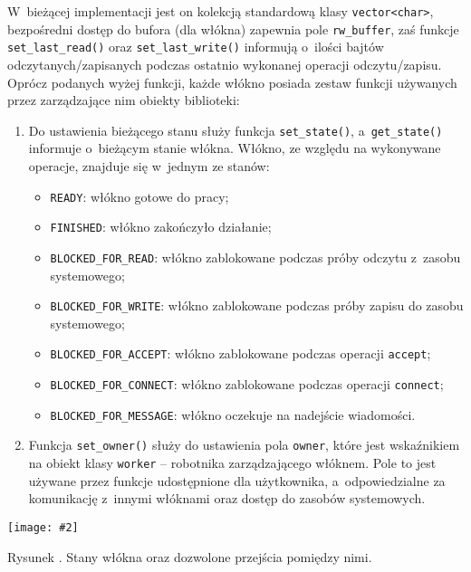 \documentclass[12pt]{mwart}
\newcommand{\code}{\texttt}
\newcommand{\procbr}{()}
\newcommand{\function}[1]{\code{#1\procbr}}
\newcounter{figmain}
\newcommand{\myownfigure}[4]{ \newcounter{#1} \setcounter{#1}{\value{figmain}} \addtocounter{figmain}{1} \begin{center} \label{fig:#1} \centering \texttt{[image: \#2]}\\ \nopagebreak[5] \parbox[t]{11.5cm}{Rysunek \arabic{#1}. #3.} \end{center}}
\begin{document}
  W~bieżącej implementacji jest on kolekcją standardową klasy \code{vector<char>},
  bezpośredni dostęp do bufora (dla włókna) zapewnia pole \code{rw\_buffer}, zaś funkcje \function{set\_last\_read} oraz \function{set\_last\_write} 
  informują o~ilości bajtów odczytanych/zapisanych podczas ostatnio wykonanej operacji odczytu/zapisu.
  Oprócz podanych wyżej funkcji, każde włókno posiada zestaw funkcji używanych przez zarządzające nim obiekty biblioteki:
  \begin{enumerate}
    \item Do ustawienia bieżącego stanu służy funkcja \function{set\_state}, a~\function{get\_state} informuje o~bieżącym stanie włókna.
    Włókno, ze względu na wykonywane operacje, znajduje się w~jednym ze stanów:
    \begin{itemize}
      \item \code{READY}: włókno gotowe do pracy;
      \item \code{FINISHED}: włókno zakończyło działanie;
      \item \code{BLOCKED\_FOR\_READ}: włókno zablokowane podczas próby odczytu z~zasobu systemowego;
      \item \code{BLOCKED\_FOR\_WRITE}:  włókno zablokowane podczas próby zapisu do zasobu systemowego;
      \item \code{BLOCKED\_FOR\_ACCEPT}:  włókno zablokowane podczas operacji \code{accept};
      \item \code{BLOCKED\_FOR\_CONNECT}:  włókno zablokowane podczas operacji \code{connect};
      \item \code{BLOCKED\_FOR\_MESSAGE}:  włókno oczekuje na nadejście wiadomości.
    \end{itemize}
    \item Funkcja \function{set\_owner} służy do ustawienia pola \code{owner}, które jest wskaźnikiem na obiekt klasy \code{worker} -- robotnika 
    zarządzającego włóknem. Pole to jest używane przez funkcje udostępnione dla użytkownika, a~odpowiedzialne za komunikację z~innymi włóknami oraz dostęp 
    do zasobów systemowych.
  \end{enumerate}
\par
\indent
  \myownfigure{LibcoroStates}{LibcoroStates.png}{Stany włókna oraz dozwolone przejścia pomiędzy nimi}{.55}
\par
\newpage
\end{document}
